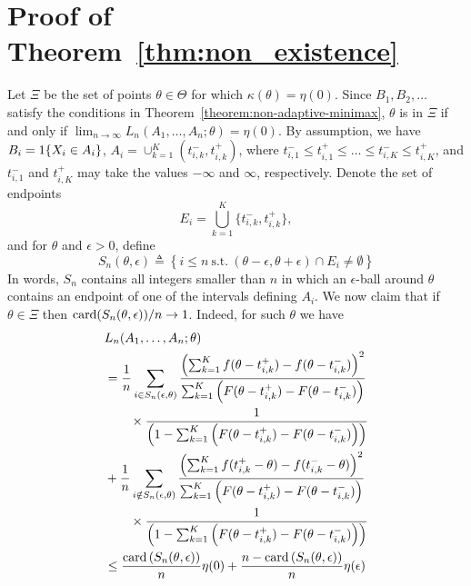 
\section{Proof of Theorem~\ref{thm:non_existence}}
\label{proof:thm:non_existence}

Let $\Xi$ be the set of points $\theta \in \Theta$ for which $\kappa(\theta)
= \eta(0)$.
%
Since $B_1,B_2,\ldots$ satisfy the conditions in
Theorem~\ref{theorem:non-adaptive-minimax}, $\theta$ is in $\Xi$ if and only
if $\lim_{n\to \infty} L_n(A_1,\ldots,A_n;\theta) = \eta(0)$. By
assumption, we have $B_i = 1\!\left\{X_i \in A_i\right\}$, $A_i =
\cup_{k=1}^K (t^-_{i,k},t^+_{i,k})$, where $t^-_{i,1} \leq t^+_{i,1} \leq \ldots
\leq t^-_{i,K} \leq t^+_{i,K}$, and $t^-_{i,1}$ and $t^+_{i,K}$ may take the values
$-\infty$ and $\infty$, respectively. Denote the set of endpoints
\begin{equation*}
  E_i = \bigcup_{k=1}^{K}\{t^-_{i,k},t^+_{i,k}\},
\end{equation*}
and for $\theta$ and $\epsilon>0$, define
\begin{equation*}
  S_n(\theta, \epsilon) \triangleq \left\{ i\leq n ~ \mbox{s.t.}~
  (\theta-\epsilon,\theta+\epsilon) \cap E_i \neq \emptyset \right\}
\end{equation*}
In words, $S_n$ contains all integers smaller than $n$ in which an
$\epsilon$-ball around $\theta$ contains an endpoint of one of the intervals
defining $A_i$.
%
We now claim that 
if $\theta \in \Xi$ then $\mathrm{card}(S_n(\theta, \epsilon))/n \to 1$. 
Indeed, for such $\theta$ we have
\begin{align}
& L_n(A_1,\ldots,A_n; \theta) \nonumber \\
& = \frac{1}{n} \sum_{i \in S_n(\epsilon,\theta)}  
\frac{ \left(\sum_{k=1}^{K}  f(\theta - t^+_{i,k})- f(\theta - t^-_{i,k}) \right)^2}{ \sum_{k=1}^{K} \left( F(\theta - t^+_{i,k})- F(\theta - t^-_{i,k}) \right)} \nonumber \\
& \qquad \times \frac{1} {\left(1-\sum_{k=1}^{K} \left( F(\theta - t^+_{i,k})- F(\theta - t^-_{i,k}) \right)\right)} \nonumber \\
& 
+ \frac{1}{n}\sum_{i \notin S_n(\epsilon,\theta) } \frac{ \left(\sum_{k=1}^{K}  f(t^+_{i,k}-\theta) - f(t^-_{i,k}-\theta) \right)^2} { \sum_{k=1}^{K} \left( F(\theta - t^+_{i,k})- F(\theta - t^-_{i,k}) \right)} \nonumber \\
& \qquad \times \frac{1} {\left(1-\sum_{k=1}^{K} \left( F(\theta - t^+_{i,k})- F(\theta - t^-_{i,k}) \right)\right)} \nonumber \\
& \le
\frac{\mathrm{card}\left(S_n(\theta,\epsilon)\right)}{n} \eta(0) + \frac{n-\mathrm{card}\left(S_n(\theta,\epsilon) \right) }{n} \eta(\epsilon) 
 \label{eq:non_existence_proof1}
\end{align}
